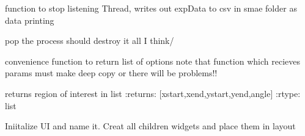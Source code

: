\documentclass[letterpaper,10pt,english]{sphinxmanual}
\begin{document}
\begin{fulllineitems}
\begin{fulllineitems}
\end{fulllineitems}


\begin{fulllineitems}
\label{MainWindow:SpinorMonitor.MainWindow.end}
function to stop listening Thread, writes out expData to csv
in smae folder as data printing

\end{fulllineitems}


\begin{fulllineitems}
\label{MainWindow:SpinorMonitor.MainWindow.finish_thread}
pop the process should destroy it all I think/

\end{fulllineitems}


\begin{fulllineitems}
\label{MainWindow:SpinorMonitor.MainWindow.get_options}
convenience function to return list of options
note that function which recieves params must make
deep copy or there will be problems!!

\end{fulllineitems}


\begin{fulllineitems}
\label{MainWindow:SpinorMonitor.MainWindow.get_roi}
returns region of interest in list
:returns: {[}xstart,xend,ystart,yend,angle{]}
:rtype: list

\end{fulllineitems}


\begin{fulllineitems}
\label{MainWindow:SpinorMonitor.MainWindow.initUI}
Iniitalize UI and name it.  Creat all children widgets and place
them in layout

\end{fulllineitems}


\end{fulllineitems}
\end{document}
